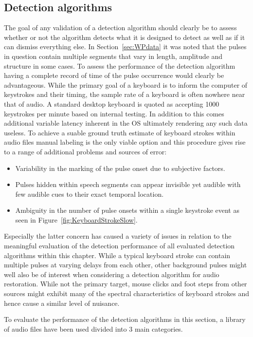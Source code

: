 \subsection{Detection algorithms}
The goal of any validation of a detection algorithm should clearly be to assess whether or not the algorithm detects what it is designed to detect as well as if it can dismiss everything else. In Section~\ref{sec:WPdata} it was noted that the pulses in question contain multiple segments that vary in length, amplitude and structure in some cases. To assess the performance of the detection algorithm having a complete record of time of the pulse occurrence would clearly be advantageous. While the primary goal of a keyboard is to inform the computer of keystrokes and their timing, the sample rate of a keyboard is often nowhere near that of audio. A standard desktop keyboard is quoted as accepting 1000 keystrokes per minute based on internal testing\cite{MSCurveKeyboard3000}. In addition to this comes additional variable latency inherent in the OS ultimately rendering any such data useless. To achieve a suable ground truth estimate of keyboard strokes within audio files manual labeling is the only viable option and this procedure gives rise to a range of additional problems and sources of error:

\begin{itemize}
  \item Variability in the marking of the pulse onset due to subjective factors.
  \item Pulses hidden within speech segments can appear invisible yet audible with few audible cues to their exact temporal location.
  \item Ambiguity in the number of pulse onsets within a single keystroke event as seen in Figure~\ref{fig:KeyboardStrokeSlow}.
\end{itemize}

Especially the latter concern has caused a variety of issues in relation to the meaningful evaluation of the detection performance of all evaluated detection algorithms within this chapter. While a typical keyboard stroke can contain multiple pulses at varying delays from each other, other background pulses might well also be of interest when considering a detection algorithm for audio restoration. While not the primary target, mouse clicks and foot steps from other sources might exhibit many of the spectral characteristics of keyboard strokes and hence cause a similar level of nuisance.

To evaluate the performance of the detection algorithms in this section, a library of audio files have been used divided into 3 main categories.


